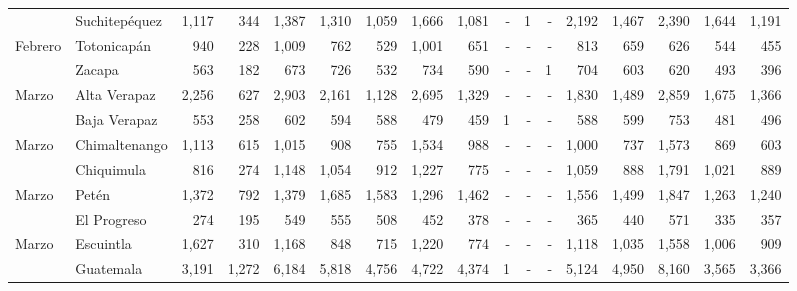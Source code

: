 \begin{landscape}
\begin{center}
\begin{longtable}{llrrrrrrrrrrrrrrr}
			\rowcolor{color1!5!white}\multicolumn{1}{l}{	\footnotesize	 Febrero 	}&	 Suchitepéquez 	&	 1,117 	&	 344 	&	 1,387 	&	 1,310 	&	 1,059 	&	 1,666 	&	 1,081 	&	 -   	&	 1 	&	 -   	&	 2,192 	&	 1,467 	&	 2,390 	&	 1,644 	&	 1,191 	\\
			\multicolumn{1}{l}{	\footnotesize	 Febrero 	}&	 Totonicapán 	&	 940 	&	 228 	&	 1,009 	&	 762 	&	 529 	&	 1,001 	&	 651 	&	 -   	&	 -   	&	 -   	&	 813 	&	 659 	&	 626 	&	 544 	&	 455 	\\
			\rowcolor{color1!5!white}\multicolumn{1}{l}{	\footnotesize	 Febrero 	}&	 Zacapa 	&	 563 	&	 182 	&	 673 	&	 726 	&	 532 	&	 734 	&	 590 	&	 -   	&	 -   	&	 1 	&	 704 	&	 603 	&	 620 	&	 493 	&	 396 	\\
			\multicolumn{1}{l}{	\footnotesize	 Marzo 	}&	 Alta Verapaz 	&	 2,256 	&	 627 	&	 2,903 	&	 2,161 	&	 1,128 	&	 2,695 	&	 1,329 	&	 -   	&	 -   	&	 -   	&	 1,830 	&	 1,489 	&	 2,859 	&	 1,675 	&	 1,366 	\\
			\rowcolor{color1!5!white}\multicolumn{1}{l}{	\footnotesize	 Marzo 	}&	 Baja Verapaz 	&	 553 	&	 258 	&	 602 	&	 594 	&	 588 	&	 479 	&	 459 	&	 1 	&	 -   	&	 -   	&	 588 	&	 599 	&	 753 	&	 481 	&	 496 	\\
			\multicolumn{1}{l}{	\footnotesize	 Marzo 	}&	 Chimaltenango 	&	 1,113 	&	 615 	&	 1,015 	&	 908 	&	 755 	&	 1,534 	&	 988 	&	 -   	&	 -   	&	 -   	&	 1,000 	&	 737 	&	 1,573 	&	 869 	&	 603 	\\
			\rowcolor{color1!5!white}\multicolumn{1}{l}{	\footnotesize	 Marzo 	}&	 Chiquimula 	&	 816 	&	 274 	&	 1,148 	&	 1,054 	&	 912 	&	 1,227 	&	 775 	&	 -   	&	 -   	&	 -   	&	 1,059 	&	 888 	&	 1,791 	&	 1,021 	&	 889 	\\
			\multicolumn{1}{l}{	\footnotesize	 Marzo 	}&	 Petén 	&	 1,372 	&	 792 	&	 1,379 	&	 1,685 	&	 1,583 	&	 1,296 	&	 1,462 	&	 -   	&	 -   	&	 -   	&	 1,556 	&	 1,499 	&	 1,847 	&	 1,263 	&	 1,240 	\\
			\rowcolor{color1!5!white}\multicolumn{1}{l}{	\footnotesize	 Marzo 	}&	 El Progreso 	&	 274 	&	 195 	&	 549 	&	 555 	&	 508 	&	 452 	&	 378 	&	 -   	&	 -   	&	 -   	&	 365 	&	 440 	&	 571 	&	 335 	&	 357 	\\
			\multicolumn{1}{l}{	\footnotesize	 Marzo 	}&	 Escuintla 	&	 1,627 	&	 310 	&	 1,168 	&	 848 	&	 715 	&	 1,220 	&	 774 	&	 -   	&	 -   	&	 -   	&	 1,118 	&	 1,035 	&	 1,558 	&	 1,006 	&	 909 	\\
			\rowcolor{color1!5!white}\multicolumn{1}{l}{	\footnotesize	 Marzo 	}&	 Guatemala 	&	 3,191 	&	 1,272 	&	 6,184 	&	 5,818 	&	 4,756 	&	 4,722 	&	 4,374 	&	 1 	&	 -   	&	 -   	&	 5,124 	&	 4,950 	&	 8,160 	&	 3,565 	&	 3,366 	\\

\end{longtable}
\end{center}
\end{landscape}
